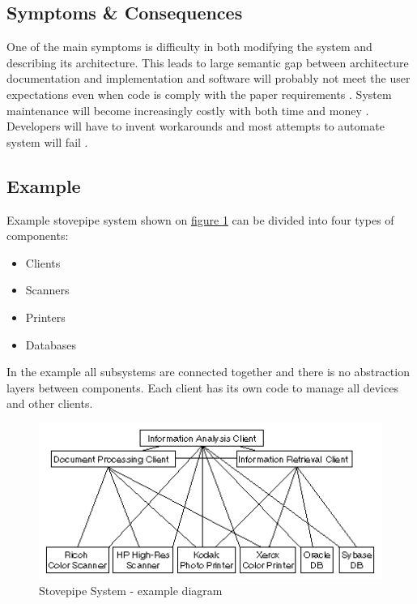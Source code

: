 \subsection{Symptoms \& Consequences}

One of the main symptoms is difficulty in both modifying the system and describing its architecture. This leads to large semantic gap between architecture documentation and implementation and software will probably not meet the user expectations even when code is comply with the paper requirements \cite{Virtual}. System maintenance will become increasingly costly with both time and money \cite{SurvivalGuide,Virtual,Solutions}. Developers will have to invent workarounds and most attempts to automate system will fail \cite{SurvivalGuide}.

\newpage
\subsection{Example}

Example stovepipe system shown on \hyperref[fig:StovepipeSystemExample]{figure \ref{fig:StovepipeSystemExample}} can be divided into four types of components:
\begin{itemize}
	\item Clients
	\item Scanners
	\item Printers
	\item Databases
\end{itemize}
In the example all subsystems are connected together and there is no abstraction layers between components. Each client has its own code to manage all devices and other clients.

\begin{figure}[!h]
    \centering
    \includegraphics[scale=1.3]{Images/ssexample.png}
    \caption[Stovepipe System Example]{Stovepipe System - example diagram \cite{Solutions}}
    \label{fig:StovepipeSystemExample}
\end{figure}


